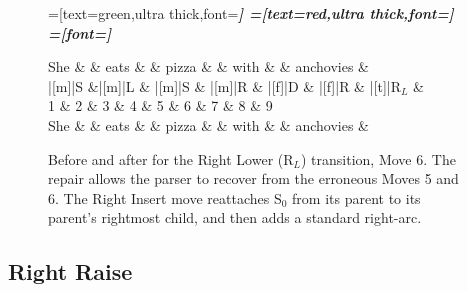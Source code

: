 \documentclass[11pt,letterpaper]{article}
\newcommand{\stacktop}{S$_0$\xspace}
\begin{document}
\begin{figure}
    \begin{dependency}[theme=simple]
=[text=green,ultra thick,font=\bfseries\itshape]
=[text=red,ultra thick,font=\bfseries\itshape]
=[font=\bfseries\itshape]


\begin{deptext}[column sep=.1cm, row sep=.1ex]
    She \&   \& eats \&     \& pizza \&   \& with \&   \& anchovies \&    \\
|[m]|S  \&|[m]|L  \& |[m]|S \& |[m]|R \& |[f]|D \& |[f]|R \& |[t]|R$_L$ \& \\
    1   \& 2 \&  3   \& 4 \&   5   \& 6 \&  7   \& 8 \&     9     \\
    She \&   \& eats \&     \& pizza \&   \& with \&   \& anchovies \&    \\
\end{deptext}
\end{dependency}
\caption{Before and after for the Right Lower (R$_L$) transition,
         Move 6.
    The repair allows the parser to recover
    from the erroneous Moves 5 and 6. The Right Insert move 
    reattaches \stacktop from its parent to its parent's rightmost child,
    and then adds a standard right-arc.\label{fig:with_anchovies}}
\end{figure}

\subsection{Right Raise}
\end{document}
